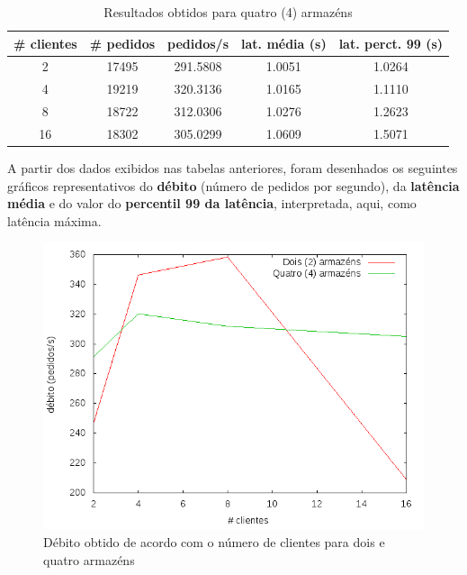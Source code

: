 \begin{table}[!h]
\center
\small
\begin{tabular}{|c|c|c|c|c|}
\hline
\textbf{\# clientes} & \textbf{\# pedidos} & \textbf{pedidos/s} & \textbf{lat. média (s)} & \textbf{lat. perct. 99 (s)}  \\ \hline
2 & 17495 & 291.5808 & 1.0051 & 1.0264  \\ \hline
4 & 19219 & 320.3136 & 1.0165 & 1.1110  \\ \hline
8 & 18722 & 312.0306 & 1.0276 & 1.2623  \\ \hline
16 & 18302 & 305.0299 & 1.0609 & 1.5071  \\ \hline
\end{tabular}
\caption{Resultados obtidos para quatro (4) armazéns}
\end{table}

\newpage

A partir dos dados exibidos nas tabelas anteriores, foram desenhados os seguintes gráficos representativos do \textbf{débito} (número de pedidos por segundo), da \textbf{latência média} e do valor do \textbf{percentil 99 da latência}, interpretada, aqui, como latência máxima.

\begin{figure}[!h]
\centering
\includegraphics[scale=.4]{img/questao-1/read-com-deb}
\caption{Débito obtido de acordo com o número de clientes para dois e quatro armazéns}
\end{figure}

